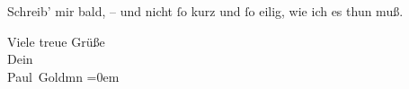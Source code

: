 \pstart
           Schreib’ mir bald, – und nicht ſo kurz und ſo 
               eilig, wie ich es thun muß.\pend
           
\pstart
           Viele treue Grüße {\\[\baselineskip]}Dein {\\[\baselineskip]}\spacefill\mbox{Paul Goldmn}\pend
           \leftskip=0em{}\endnumbering{}
\begin{anhang}
\end{anhang}
      